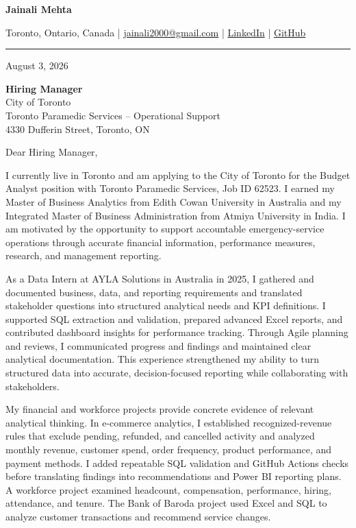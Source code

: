 \documentclass[letterpaper,10pt]{article}
\begin{document}
\begin{center}
  {\fontsize{17}{19}\selectfont\textbf{Jainali Mehta}}\par\vspace{2pt}
  \small Toronto, Ontario, Canada \;|\;
  \href{mailto:jainali2000@gmail.com}{jainali2000@gmail.com} \;|\;
  \href{https://www.linkedin.com/in/jainali-mehta}{LinkedIn} \;|\;
  \href{https://github.com/jainalimehta}{GitHub}
\end{center}
\vspace{-5pt}
\noindent\rule{\textwidth}{0.4pt}

August 3, 2026

\textbf{Hiring Manager}\\
City of Toronto\\
Toronto Paramedic Services -- Operational Support\\
4330 Dufferin Street, Toronto, ON

Dear Hiring Manager,

I currently live in Toronto and am applying to the City of Toronto for the Budget Analyst position with Toronto Paramedic Services, Job ID 62523. I earned my Master of Business Analytics from Edith Cowan University in Australia and my Integrated Master of Business Administration from Atmiya University in India. I am motivated by the opportunity to support accountable emergency-service operations through accurate financial information, performance measures, research, and management reporting.

As a Data Intern at AYLA Solutions in Australia in 2025, I gathered and documented business, data, and reporting requirements and translated stakeholder questions into structured analytical needs and KPI definitions. I supported SQL extraction and validation, prepared advanced Excel reports, and contributed dashboard insights for performance tracking. Through Agile planning and reviews, I communicated progress and findings and maintained clear analytical documentation. This experience strengthened my ability to turn structured data into accurate, decision-focused reporting while collaborating with stakeholders.

My financial and workforce projects provide concrete evidence of relevant analytical thinking. In e-commerce analytics, I established recognized-revenue rules that exclude pending, refunded, and cancelled activity and analyzed monthly revenue, customer spend, order frequency, product performance, and payment methods. I added repeatable SQL validation and GitHub Actions checks before translating findings into recommendations and Power BI reporting plans. A workforce project examined headcount, compensation, performance, hiring, attendance, and tenure. The Bank of Baroda project used Excel and SQL to analyze customer transactions and recommend service changes.
\end{document}
